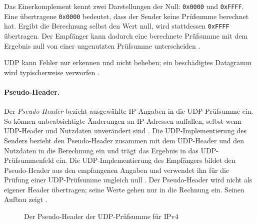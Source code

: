 Das Einerkomplement kennt zwei Darstellungen der Null: \texttt{0x0000} und \texttt{0xFFFF}.
Eine übertragene \texttt{0x0000} bedeutet, dass der Sender keine Prüfsumme berechnet hat. Ergibt die
Berechnung selbst den Wert null, wird stattdessen \texttt{0xFFFF} übertragen. Der Empfänger kann dadurch
eine berechnete Prüfsumme mit dem Ergebnis null von einer ungenutzten Prüfsumme unterscheiden \cite{rfc768}.

UDP kann Fehler nur erkennen und nicht beheben; ein beschädigtes Datagramm wird typischerweise verworfen
\cite{kurose2021topdown}.

\paragraph{Pseudo-Header.}
Der \textit{Pseudo-Header} bezieht ausgewählte IP-Angaben in die UDP-Prüfsumme ein. So können unbeabsichtigte
Änderungen an IP-Adressen auffallen, selbst wenn UDP-Header und Nutzdaten unverändert sind \cite{rfc768}.
Die UDP-Implementierung des Senders bezieht den Pseudo-Header zusammen mit dem UDP-Header und den Nutzdaten
in die Berechnung ein und trägt das Ergebnis in das UDP-Prüfsummenfeld ein. Die UDP-Implementierung des
Empfängers bildet den Pseudo-Header aus den empfangenen Angaben und verwendet ihn für die Prüfung einer
UDP-Prüfsumme ungleich null \cite{rfc768}. Der Pseudo-Header wird nicht als eigener Header übertragen;
seine Werte gehen nur in die Rechnung ein. Seinen Aufbau zeigt .

\begin{figure}[H]
  \centering
  \caption[Der Pseudo-Header der UDP-Prüfsumme für IPv4]{Der Pseudo-Header der UDP-Prüfsumme für IPv4 \cite{rfc768}}
  \label{fig:udp-pseudo-header}
\end{figure}

